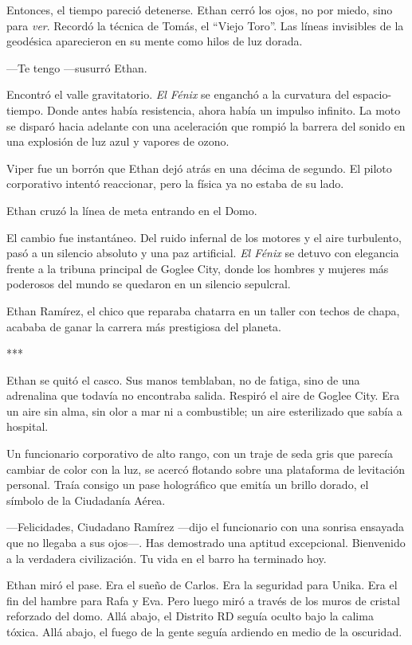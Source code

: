 \documentclass[11pt,twoside]{book}
\begin{document}
Entonces, el tiempo pareció detenerse. Ethan cerró los ojos, no por miedo, sino para \textit{ver}. Recordó la técnica de Tomás, el ``Viejo Toro''. Las líneas invisibles de la geodésica aparecieron en su mente como hilos de luz dorada.

---Te tengo ---susurró Ethan.

Encontró el valle gravitatorio. \textit{El Fénix} se enganchó a la curvatura del espacio-tiempo. Donde antes había resistencia, ahora había un impulso infinito. La moto se disparó hacia adelante con una aceleración que rompió la barrera del sonido en una explosión de luz azul y vapores de ozono.

Viper fue un borrón que Ethan dejó atrás en una décima de segundo. El piloto corporativo intentó reaccionar, pero la física ya no estaba de su lado.

Ethan cruzó la línea de meta entrando en el Domo.

El cambio fue instantáneo. Del ruido infernal de los motores y el aire turbulento, pasó a un silencio absoluto y una paz artificial. \textit{El Fénix} se detuvo con elegancia frente a la tribuna principal de Goglee City, donde los hombres y mujeres más poderosos del mundo se quedaron en un silencio sepulcral.

Ethan Ramírez, el chico que reparaba chatarra en un taller con techos de chapa, acababa de ganar la carrera más prestigiosa del planeta.

\bigskip
\begin{center}***\end{center}
\bigskip

Ethan se quitó el casco. Sus manos temblaban, no de fatiga, sino de una adrenalina que todavía no encontraba salida. Respiró el aire de Goglee City. Era un aire sin alma, sin olor a mar ni a combustible; un aire esterilizado que sabía a hospital.

Un funcionario corporativo de alto rango, con un traje de seda gris que parecía cambiar de color con la luz, se acercó flotando sobre una plataforma de levitación personal. Traía consigo un pase holográfico que emitía un brillo dorado, el símbolo de la Ciudadanía Aérea.

---Felicidades, Ciudadano Ramírez ---dijo el funcionario con una sonrisa ensayada que no llegaba a sus ojos---. Has demostrado una aptitud excepcional. Bienvenido a la verdadera civilización. Tu vida en el barro ha terminado hoy.

Ethan miró el pase. Era el sueño de Carlos. Era la seguridad para Unika. Era el fin del hambre para Rafa y Eva. Pero luego miró a través de los muros de cristal reforzado del domo. Allá abajo, el Distrito RD seguía oculto bajo la calima tóxica. Allá abajo, el fuego de la gente seguía ardiendo en medio de la oscuridad.
\end{document}
